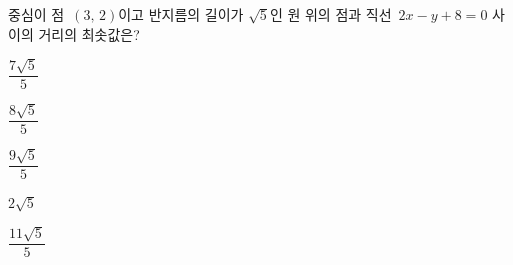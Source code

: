 중심이 점~$(3,\,2)$이고 반지름의 길이가 $\sqrt{5}$인 원 위의 점과 직선~$2x-y+8=0$ 사이의 거리의 최솟값은?
\begin{choices32}{\rule[-3ex]{0pt}{8ex}$\dfrac{7\sqrt{5}}{5}$}{\rule[-3ex]{0pt}{8ex}$\dfrac{8\sqrt{5}}{5}$}{\rule[-3ex]{0pt}{8ex}$\dfrac{9\sqrt{5}}{5}$}{\rule[-3ex]{0pt}{8ex}$2\sqrt{5}$}{\rule[-3ex]{0pt}{8ex}$\dfrac{11\sqrt{5}}{5}$}\end{choices32}
